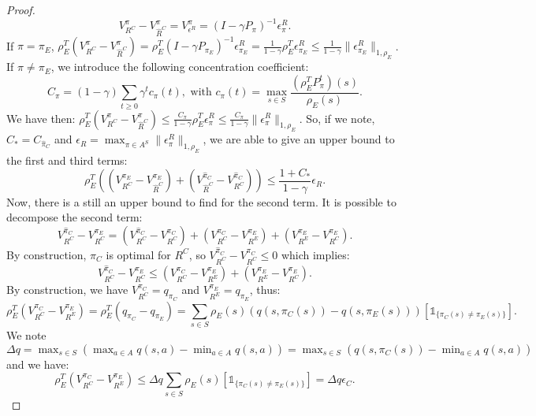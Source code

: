 \documentclass[smallextended]{svjour3}
\begin{document}
\begin{proof}
\begin{equation}
V^{\pi}_{R^C}-V^{\pi}_{\hat{R}^C}=V^{\pi}_{\epsilon^R}=(I-\gamma P_\pi)^{-1}\epsilon^R_{\pi}.
\end{equation}
If $\pi=\pi_E$, $\rho_E^T(V^{\pi}_{R^C}-V^{\pi}_{\hat{R}^C})=\rho_E^T(I-\gamma P_{\pi_E})^{-1}\epsilon^R_{\pi_E}=\frac{1}{1-\gamma}\rho_E^T\epsilon^R_{\pi_E}\leq\frac{1}{1-\gamma}\|\epsilon^R_{\pi_E}\|_{1,\rho_E}$.
If $\pi\neq\pi_E$, we introduce the following concentration coefficient:
\begin{equation}
C_{\pi}=(1-\gamma)\sum_{t\geq0}\gamma^tc_{\pi}(t), \text{ with } c_{\pi}(t)=\max_{s\in S}\frac{(\rho_E^TP^t_\pi)(s)}{\rho_E(s)}.
\end{equation}
We have then: $\rho_E^T(V^{\pi}_{R^C}-V^{\pi}_{\hat{R}^C})\leq\frac{C_\pi}{1-\gamma}\rho_E^T\epsilon^R_{\pi}\leq\frac{C_\pi}{1-\gamma}\|\epsilon^R_{\pi}\|_{1,\rho_E}$. So, if we note, $C_*=C_{\hat{\pi}_C}$ and $\epsilon_R=\max_{\pi\in A^S}\|\epsilon_\pi^R\|_{1,\rho_E}$, we are able to give an upper bound to the first and third terms:
\begin{equation}
\rho_E^T((V^{\pi_E}_{R^C}-V^{\pi_E}_{\hat{R}^C})+(V^{\hat{\pi}_C}_{\hat{R}^C}-V^{\hat{\pi}_C}_{R^C}))\leq\frac{1+C_*}{1-\gamma}\epsilon_R.
\end{equation}
Now, there is a still an upper bound to find for the second term. It is possible to decompose the second term:
\begin{equation}
V^{\hat{\pi}_C}_{R^C}-V^{\pi_E}_{R^C}=(V^{\hat{\pi}_C}_{R^C}-V^{\pi_C}_{R^C})+(V^{\pi_C}_{R^C}-V^{\pi_E}_{R^E})+(V^{\pi_E}_{R^E}-V^{\pi_E}_{R^C}).
\end{equation}
By construction, $\pi_C$ is optimal for $R^C$, so $V^{\hat{\pi}_C}_{R^C}-V^{\pi_C}_{R^C}\leq0$ which implies:
\begin{equation}
V^{\hat{\pi}_C}_{R^C}-V^{\pi_E}_{R^C}\leq(V^{\pi_C}_{R^C}-V^{\pi_E}_{R^E})+(V^{\pi_E}_{R^E}-V^{\pi_E}_{R^C}).
\end{equation}
By construction, we have $V^{\pi_C}_{R^C}=q_{\pi_C}$ and $V^{\pi_E}_{R^E}=q_{\pi_E}$, thus:
\begin{equation}
\rho_E^T(V^{\pi_C}_{R^C}-V^{\pi_E}_{R^E})=\rho_E^T(q_{\pi_C}-q_{\pi_E})=\sum_{s\in S}\rho_E(s)(q(s,\pi_C(s))-q(s,\pi_E(s)))[\mathds{1}_{\{\pi_C(s)\neq\pi_E(s)\}}].
\end{equation}
We note $\Delta q=\max_{s\in S}(\max_{a\in A}q(s,a)-\min_{a\in A}q(s,a))=\max_{s\in S}(q(s,\pi_C(s))-\min_{a\in A}q(s,a))$ and we have:
\begin{equation}
\rho_E^T(V^{\pi_C}_{R^C}-V^{\pi_E}_{R^E})\leq\Delta q\sum_{s\in S}\rho_E(s)[\mathds{1}_{\{\pi_C(s)\neq\pi_E(s)\}}]= \Delta q \epsilon_C.

\end{equation}
\end{proof}
\end{document}
